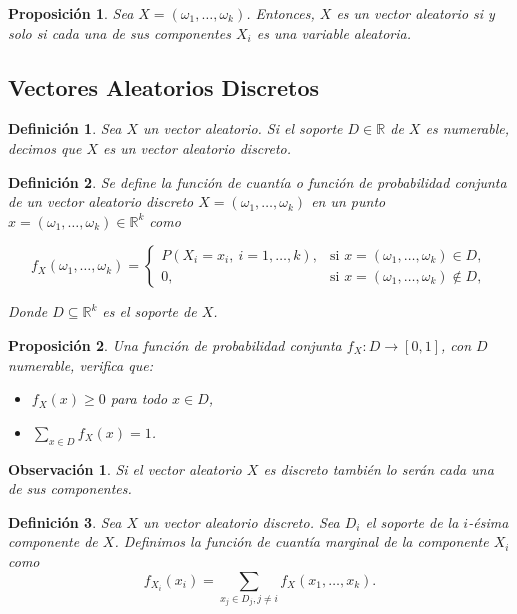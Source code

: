 \documentclass{report}
\newtheorem{prop}{Proposición}[section]
\newtheorem{dfn}{Definición}[section]
\newtheorem{obs}{Observación}[section]
\begin{document}
\begin{prop}
Sea \( X = (\omega_1, \dots, \omega_k) \). Entonces, \( X \) es un vector aleatorio si y solo si cada una de sus componentes \( X_i \) es una variable aleatoria.
\end{prop}

\subsection{Vectores Aleatorios Discretos}

\begin{dfn}
Sea $X$ un vector aleatorio. Si el soporte $D\in\mathbb{R}$ de $X$ es numerable, decimos que $X$ es un \emph{vector aleatorio discreto}.
\end{dfn}

\begin{dfn}
Se define la \textit{función de cuantía} o \textit{función de probabilidad conjunta} de un vector aleatorio discreto
\( X = (\omega_1, \dots, \omega_k) \) en un punto \( x = (\omega_1, \dots, \omega_k) \in \mathbb{R}^k \) como

\[
f_X(\omega_1, \dots, \omega_k) =
\begin{cases}
P(X_i = x_i, \ i = 1, \dots, k), & \text{si } x = (\omega_1, \dots, \omega_k) \in D, \\
0, & \text{si } x = (\omega_1, \dots, \omega_k) \notin D,
\end{cases}
\]

Donde \( D \subseteq \mathbb{R}^k \) es el soporte de \( X \).
\end{dfn}

\begin{prop}
Una función de probabilidad conjunta \( f_X \colon D \to [0,1] \), con $D$ numerable, verifica que:

\begin{itemize}
    \item \( f_X(x) \geq 0 \) para todo \( x \in D \),
    \item \( \displaystyle\sum_{x \in D} f_X(x) = 1 \).
\end{itemize}
\end{prop}

\begin{obs}
    Si el vector aleatorio $X$ es discreto también lo serán cada una de sus componentes.
\end{obs}

\begin{dfn}
    Sea $X$ un vector aleatorio discreto. Sea $D_i$ el soporte de la $i$-ésima componente de $X$. Definimos la función de cuantía marginal de la componente
    $X_i$ como
    \begin{equation*}
        f_{X_i}(x_i) = \sum_{x_j\in D_j, j\neq i} f_X(x_1,\ldots,x_k).
    \end{equation*}
\end{dfn}
\end{document}
